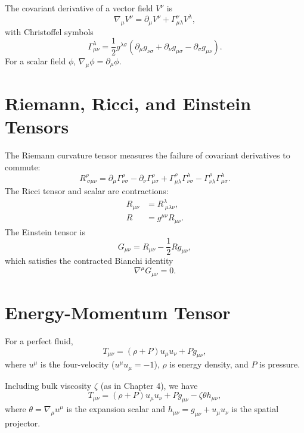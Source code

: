 \documentclass[12pt,a4paper]{book}
\begin{document}
The covariant derivative of a vector field $V^\nu$ is
\begin{equation}
    \nabla_\mu V^\nu = \partial_\mu V^\nu + \Gamma^\nu_{\mu\lambda} V^\lambda,
\end{equation}
with Christoffel symbols
\begin{equation}
    \Gamma^\lambda_{\mu\nu} = \frac12 g^{\lambda\sigma} (\partial_\mu g_{\nu\sigma} + \partial_\nu g_{\mu\sigma} - \partial_\sigma g_{\mu\nu}).
\end{equation}
For a scalar field $\phi$, $\nabla_\mu \phi = \partial_\mu \phi$.

\section{Riemann, Ricci, and Einstein Tensors}

The Riemann curvature tensor measures the failure of covariant derivatives to commute:
\begin{equation}
    R^\rho_{\ \sigma\mu\nu} = \partial_\mu \Gamma^\rho_{\nu\sigma} - \partial_\nu \Gamma^\rho_{\mu\sigma} + \Gamma^\rho_{\mu\lambda} \Gamma^\lambda_{\nu\sigma} - \Gamma^\rho_{\nu\lambda} \Gamma^\lambda_{\mu\sigma}.
\end{equation}
The Ricci tensor and scalar are contractions:
\begin{align}
    R_{\mu\nu} &= R^\lambda_{\ \mu\lambda\nu}, \\
    R &= g^{\mu\nu} R_{\mu\nu}.
\end{align}
The Einstein tensor is
\begin{equation}
    G_{\mu\nu} = R_{\mu\nu} - \frac12 R g_{\mu\nu},
\end{equation}
which satisfies the contracted Bianchi identity
\begin{equation}
    \nabla^\mu G_{\mu\nu} = 0.
\end{equation}

\section{Energy-Momentum Tensor}

For a perfect fluid,
\begin{equation}
    T_{\mu\nu} = (\rho + P) u_\mu u_\nu + P g_{\mu\nu},
\end{equation}
where $u^\mu$ is the four-velocity ($u^\mu u_\mu = -1$), $\rho$ is energy density, and $P$ is pressure.

Including bulk viscosity $\zeta$ (as in Chapter 4), we have
\begin{equation}
    T_{\mu\nu} = (\rho + P) u_\mu u_\nu + P g_{\mu\nu} - \zeta \theta h_{\mu\nu},
\end{equation}
where $\theta = \nabla_\mu u^\mu$ is the expansion scalar and $h_{\mu\nu} = g_{\mu\nu} + u_\mu u_\nu$ is the spatial projector.
\end{document}
